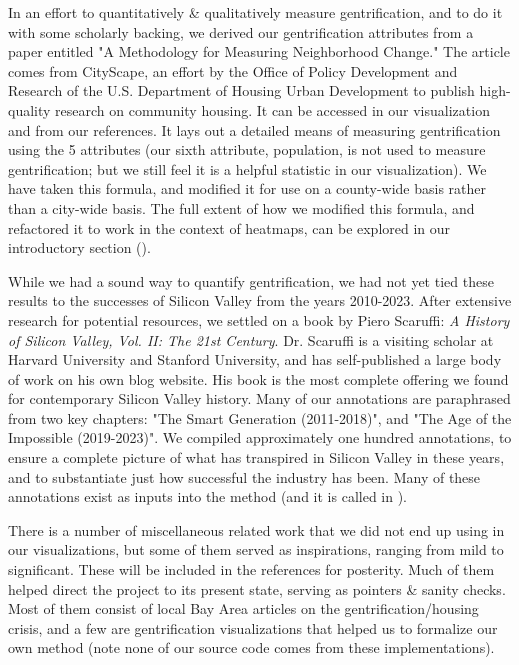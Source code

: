 \documentclass{article}
\begin{document}
    In an effort to quantitatively \& qualitatively measure gentrification, and to do it with some scholarly backing, we derived our gentrification attributes from a paper entitled "A Methodology for Measuring Neighborhood Change." The article comes from CityScape, an effort by the Office of Policy Development and Research of the U.S. Department of Housing Urban Development to publish high-quality research on community housing. It can be accessed in our visualization and from our references. It lays out a detailed means of measuring gentrification using the 5 attributes (our sixth attribute, population, is not used to measure gentrification; but we still feel it is a helpful statistic in our visualization). We have taken this formula, and modified it for use on a county-wide basis rather than a city-wide basis. The full extent of how we modified this formula, and refactored it to work in the context of heatmaps, can be explored in our introductory section ().
    
    While we had a sound way to quantify gentrification, we had not yet tied these results to the successes of Silicon Valley from the years 2010-2023. After extensive research for potential resources, we settled on a book by Piero Scaruffi: \textit{A History of Silicon Valley, Vol. II: The 21st Century}. Dr. Scaruffi is a visiting scholar at Harvard University and Stanford University, and has self-published a large body of work on his own blog website. His book is the most complete offering we found for contemporary Silicon Valley history. Many of our annotations are paraphrased from two key chapters: "The Smart Generation (2011-2018)", and "The Age of the Impossible (2019-2023)". We compiled approximately one hundred annotations, to ensure a complete picture of what has transpired in Silicon Valley in these years, and to substantiate just how successful the industry has been. Many of these annotations exist as inputs into the  method (and it is called in ).
    
    There is a number of miscellaneous related work that we did not end up using in our visualizations, but some of them served as inspirations, ranging from mild to significant. These will be included in the references for posterity. Much of them helped direct the project to its present state, serving as pointers \& sanity checks. Most of them consist of local Bay Area articles on the gentrification/housing crisis, and a few are gentrification visualizations that helped us to formalize our own method (note none of our source code comes from these implementations).
\end{document}
